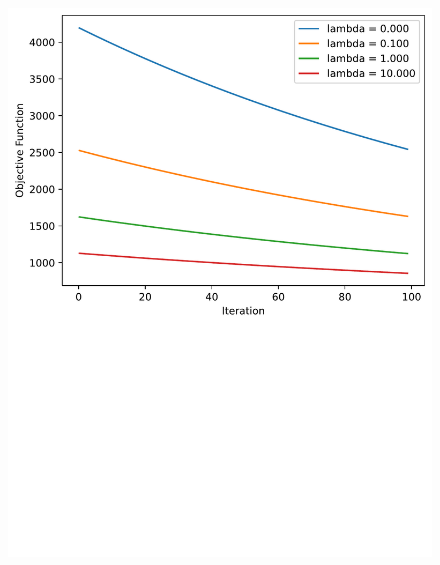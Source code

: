 \documentclass{article}
\begin{document}
\begin{enumerate}
\begin{sol}
\begin{lstlisting}
    \end{lstlisting}
    \begin{figure}[!ht]
        \begin{center}
        \includegraphics[scale = 0.5]{./6.3.pdf}
        \end{center}
    \end{figure}
\end{sol}
\color{black}
\end{enumerate}
\end{document}
